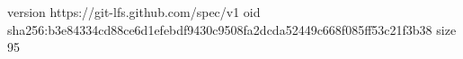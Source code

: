 version https://git-lfs.github.com/spec/v1
oid sha256:b3e84334cd88ce6d1efebdf9430c9508fa2dcda52449c668f085ff53c21f3b38
size 95
